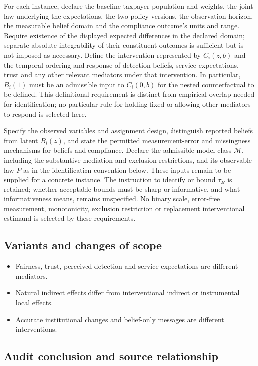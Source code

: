 \documentclass[11pt,a4paper]{article}
\begin{document}
For each instance, declare the baseline taxpayer population and weights, the joint law underlying the expectations, the two policy versions, the observation horizon, the measurable belief domain and the compliance outcome's units and range. Require existence of the displayed expected differences in the declared domain; separate absolute integrability of their constituent outcomes is sufficient but is not imposed as necessary. Define the intervention represented by $C_i(z,b)$ and the temporal ordering and response of detection beliefs, service expectations, trust and any other relevant mediators under that intervention. In particular, $B_i(1)$ must be an admissible input to $C_i(0,b)$ for the nested counterfactual to be defined. This definitional requirement is distinct from empirical overlap needed for identification; no particular rule for holding fixed or allowing other mediators to respond is selected here.

Specify the observed variables and assignment design, distinguish reported beliefs from latent $B_i(z)$, and state the permitted measurement-error and missingness mechanisms for beliefs and compliance. Declare the admissible model class $\mathcal M$, including the substantive mediation and exclusion restrictions, and its observable law $P$ as in the identification convention below. These inputs remain to be supplied for a concrete instance. The instruction to identify or bound $\tau_B$ is retained; whether acceptable bounds must be sharp or informative, and what informativeness means, remains unspecified. No binary scale, error-free measurement, monotonicity, exclusion restriction or replacement interventional estimand is selected by these requirements.

\subsection*{Variants and changes of scope}

\begin{itemize}
\item Fairness, trust, perceived detection and service expectations are different mediators.
\item Natural indirect effects differ from interventional indirect or instrumental local effects.
\item Accurate institutional changes and belief-only messages are different interventions.
\end{itemize}

\subsection*{Audit conclusion and source relationship}
\end{document}
